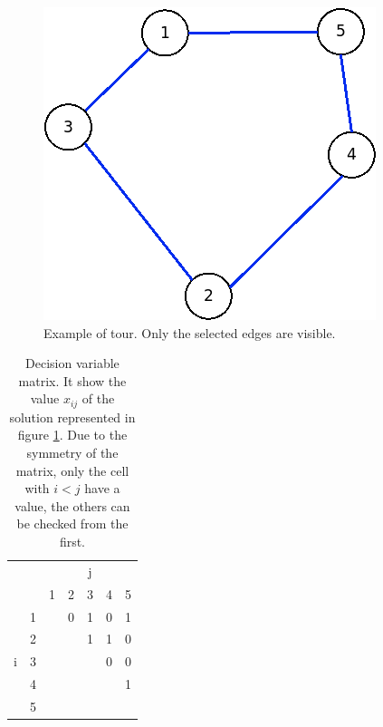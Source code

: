 \begin{figure}[h]
	\centering
	\includegraphics[width=.3\columnwidth]{img/symTSP_example.png}
	\caption{Example of tour. Only the selected edges are visible.}
	\label{fig:symTSP}
\end{figure}

\begin{table}[h!]
	\begin{center}
		\caption{Decision variable matrix. It show the value $ x_{ij} $ of the solution represented in figure \ref{fig:symTSP}. Due to the symmetry of the matrix, only the cell with $ i < j $ have a value, the others can be checked from the first.}
		\label{tab:symTSP_solution}
		\begin{tabular}{cc|c|c|c|c|c|}
			 \multicolumn{2}{c}{} & \multicolumn{5}{c}{j} \\ %
			& \multicolumn{1}{c}{} & \multicolumn{1}{c}{1} & \multicolumn{1}{c}{2} & \multicolumn{1}{c}{3} & \multicolumn{1}{c}{4} & \multicolumn{1}{c}{5} \\ \cline{3-7}
			\multirow{5}{*}{i} 	& 1 & \cellcolor{Black} & 0 & 1 & 0 & 1 \\ \cline{3-7}
								& 2 &  & \cellcolor{Black} & 1 & 1 & 0 \\ \cline{3-7}
								& 3 &  &  & \cellcolor{Black} & 0 & 0 \\ \cline{3-7}
								& 4 &  &  &  & \cellcolor{Black} & 1 \\ \cline{3-7}
								& 5 &  &  &  &  & \cellcolor{Black} \\ \cline{3-7}
		\end{tabular}
	\end{center}
\end{table}




